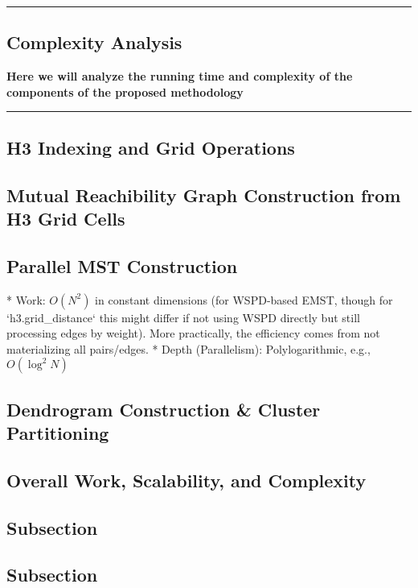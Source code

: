 {\color{gray}\hrule}
\begin{center}
\section{Complexity Analysis}
\textbf{Here we will analyze the running time and complexity of the components of the proposed methodology}
\bigskip
\end{center}
{\color{gray}\hrule}
\subsection{H3 Indexing and Grid Operations}
\lipsum[1]
\subsection{Mutual Reachibility Graph Construction from H3 Grid Cells}
\lipsum[1-3]

\subsection{Parallel MST Construction}
* Work: $O(N^2)$ in constant dimensions (for WSPD-based EMST, though for `h3.grid_distance` this might differ if not using WSPD directly but still processing edges by weight). More practically, the efficiency comes from not materializing all pairs/edges.
* Depth (Parallelism): Polylogarithmic, e.g., $O(\log^2 N)$ 

\subsection{Dendrogram Construction & Cluster Partitioning}
\subsection{Overall Work, Scalability, and Complexity}
\subsection{Subsection}
\subsection{Subsection}

